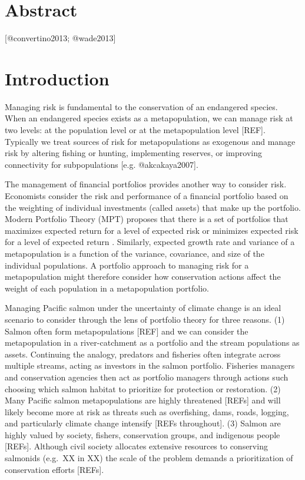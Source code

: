 \section{Abstract}

{[}@convertino2013; @wade2013{]}

\section{Introduction}

Managing risk is fundamental to the conservation of an endangered species. When an endangered species exists as a metapopulation, we can manage risk at two levels: at the population level or at the metapopulation level {[}REF{]}. Typically we treat sources of risk for metapopulations as exogenous and manage risk by altering fishing or hunting, implementing reserves, or improving connectivity for subpopulations {[}e.g. @akcakaya2007{]}.

The management of financial portfolios provides another way to consider risk. Economists consider the risk and performance of a financial portfolio based on the weighting of individual investments (called assets) that make up the portfolio. Modern Portfolio Theory (MPT) proposes that there is a set of portfolios that maximizes expected return for a level of expected risk or minimizes expected risk for a level of expected return \citep{markowitz1952, markowitz1959}. Similarly, expected growth rate and variance of a metapopulation is a function of the variance, covariance, and size of the individual populations. A portfolio approach to managing risk for a metapopulation might therefore consider how conservation actions affect the weight of each population in a metapopulation portfolio.

Managing Pacific salmon under the uncertainty of climate change is an ideal scenario to consider through the lens of portfolio theory for three reasons. (1) Salmon often form metapopulations {[}REF{]} and we can consider the metapopulation in a river-catchment as a portfolio and the stream populations as assets. Continuing the analogy, predators and fisheries often integrate across multiple streams, acting as investors in the salmon portfolio. Fisheries managers and conservation agencies then act as portfolio managers through actions such choosing which salmon habitat to prioritize for protection or restoration. (2) Many Pacific salmon metapopulations are highly threatened {[}REFs{]} and will likely become more at risk as threats such as overfishing, dams, roads, logging, and particularly climate change intensify {[}REFs throughout{]}. (3) Salmon are highly valued by society, fishers, conservation groups, and indigenous people {[}REFs{]}. Although civil society allocates extensive resources to conserving salmonids (e.g.~XX in XX) the scale of the problem demands a prioritization of conservation efforts {[}REFs{]}.

